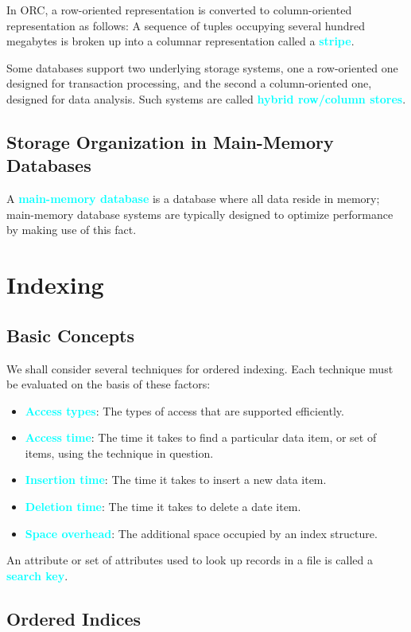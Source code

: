 \documentclass[a4paper,12pt,twoside,openany]{book}
\newcommand{\textcy}[1]{\textbf{\textcolor{cyan}{#1}}}
\begin{document}
In ORC, a row-oriented representation is converted to column-oriented representation as follows: A sequence of tuples occupying several hundred megabytes is broken up into a columnar representation called a \textcy{stripe}.

Some databases support two underlying storage systems, one a row-oriented one designed for transaction processing, and the second a column-oriented one, designed for data analysis. Such systems are called \textcy{hybrid row/column stores}.

\section{Storage Organization in Main-Memory Databases}

A \textcy{main-memory database} is a database where all data reside in memory; main-memory database systems are typically designed to optimize performance by making use of this fact.

\chapter{Indexing}
\section{Basic Concepts}

We shall consider several techniques for ordered indexing. Each technique must be evaluated on the basis of these factors:
\begin{itemize}
    \item \textcy{Access types}: The types of access that are supported efficiently.
    \item \textcy{Access time}: The time it takes to find a particular data item, or set of items, using the technique in question.
    \item \textcy{Insertion time}: The time it takes to insert a new data item.
    \item \textcy{Deletion time}: The time it takes to delete a date item.
    \item \textcy{Space overhead}: The additional space occupied by an index structure.
\end{itemize}

An attribute or set of attributes used to look up records in a file is called a \textcy{search key}.

\section{Ordered Indices}
\end{document}
